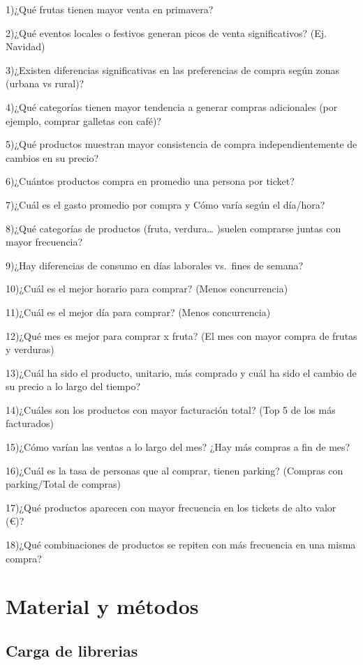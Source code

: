 \documentclass[
]{article}
\begin{document}
1)¿Qué frutas tienen mayor venta en primavera?

2)¿Qué eventos locales o festivos generan picos de venta significativos? (Ej. Navidad)

3)¿Existen diferencias significativas en las preferencias de compra según zonas (urbana vs rural)?

4)¿Qué categorías tienen mayor tendencia a generar compras adicionales (por ejemplo, comprar galletas con café)?

5)¿Qué productos muestran mayor consistencia de compra independientemente de cambios en su precio?

6)¿Cuántos productos compra en promedio una persona por ticket?

7)¿Cuál es el gasto promedio por compra y Cómo varía según el día/hora?

8)¿Qué categorías de productos (fruta, verdura\ldots{} )suelen comprarse juntas con mayor frecuencia?

9)¿Hay diferencias de consumo en días laborales vs.~fines de semana?

10)¿Cuál es el mejor horario para comprar? (Menos concurrencia)

11)¿Cuál es el mejor día para comprar? (Menos concurrencia)

12)¿Qué mes es mejor para comprar x fruta? (El mes con mayor compra de frutas y verduras)

13)¿Cuál ha sido el producto, unitario, más comprado y cuál ha sido el cambio de su precio a lo largo del tiempo?

14)¿Cuáles son los productos con mayor facturación total? (Top 5 de los más facturados)

15)¿Cómo varían las ventas a lo largo del mes? ¿Hay más compras a fin de mes?

16)¿Cuál es la tasa de personas que al comprar, tienen parking? (Compras con parking/Total de compras)

17)¿Qué productos aparecen con mayor frecuencia en los tickets de alto valor (€)?

18)¿Qué combinaciones de productos se repiten con más frecuencia en una misma compra?

\section{Material y métodos}\label{material-y-muxe9todos}

\subsection{Carga de librerias}\label{carga-de-librerias}
\end{document}
